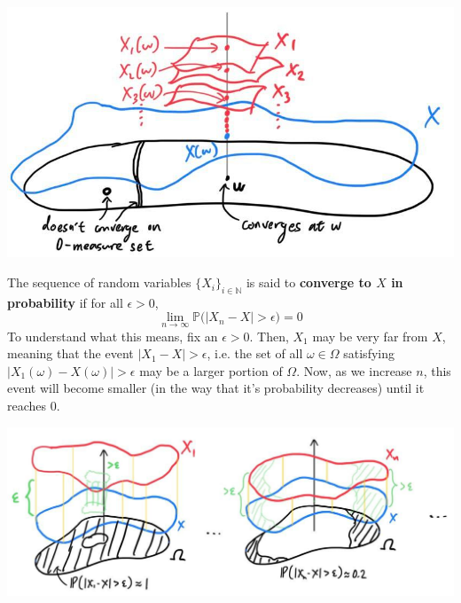 \documentclass{article}
\begin{document}
\begin{definition}
      \begin{center}
        \includegraphics[scale=0.3]{img/almost_sure_convergence_2.jpg}
      \end{center}
    \end{definition}

    \begin{definition}
      The sequence of random variables $\{ X_i\}_{i \in \mathbb{N}}$ is said to \textbf{converge to $X$ in probability} if for all $\epsilon > 0$, 
      \begin{equation}
        \lim_{n \rightarrow \infty} \mathbb{P} \big( |X_n - X| > \epsilon \big) = 0
      \end{equation}
      To understand what this means, fix an $\epsilon > 0$. Then, $X_1$ may be very far from $X$, meaning that the event $|X_1 - X| > \epsilon$, i.e. the set of all $\omega \in \Omega$ satisfying $|X_1(\omega) - X (\omega)| > \epsilon$ may be a larger portion of $\Omega$. Now, as we increase $n$, this event will become smaller (in the way that it's probability decreases) until it reaches $0$. 
      \begin{center}
        \includegraphics[scale=0.3]{img/convergence_in_probability.jpg}
      \end{center}
    \end{definition}
\end{document}
